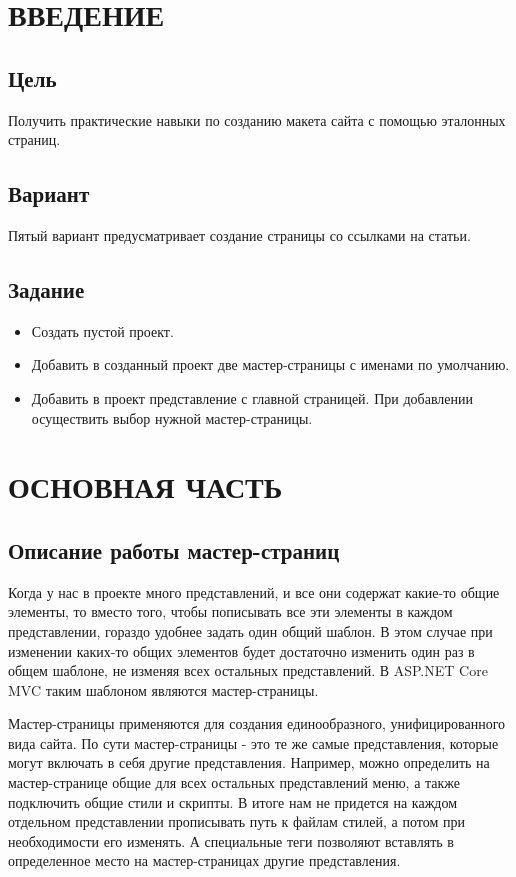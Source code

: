 \documentclass[a4paper,14pt]{extreport}
\begin{document}
	


\tableofcontents

\chapter{ВВЕДЕНИЕ}

\section{Цель}
Получить практические навыки по созданию макета сайта с помощью эталонных страниц.

\section{Вариант}
Пятый вариант предусматривает создание страницы со ссылками на статьи.

\section{Задание}

\begin{itemize}
	\item Создать пустой проект.
	\item Добавить в созданный проект две мастер-страницы с именами по умолчанию.
	\item Добавить в проект представление с главной страницей. При добавлении осуществить выбор нужной мастер-страницы.
\end{itemize}

\chapter{ОСНОВНАЯ ЧАСТЬ}

\section{Описание работы мастер-страниц}
Когда у нас в проекте много представлений, и все они содержат какие-то общие элементы, то вместо того, чтобы пописывать все эти элементы в каждом представлении, гораздо удобнее задать один общий шаблон. В этом случае при изменении каких-то общих элементов будет достаточно изменить один раз в общем шаблоне, не изменяя всех остальных представлений. В ASP.NET Core MVC таким шаблоном являются мастер-страницы.

Мастер-страницы применяются для создания единообразного, унифицированного вида сайта. По сути мастер-страницы - это те же самые представления, которые могут включать в себя другие представления. Например, можно определить на мастер-странице общие для всех остальных представлений меню, а также подключить общие стили и скрипты. В итоге нам не придется на каждом отдельном представлении прописывать путь к файлам стилей, а потом при необходимости его изменять. А специальные теги позволяют вставлять в определенное место на мастер-страницах другие представления.
\end{document}
